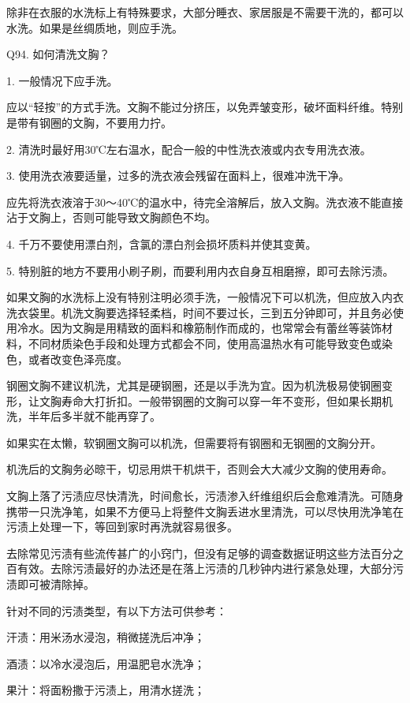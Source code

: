 \documentclass[12pt,UTF8]{ctexbook}
\begin{document}
除非在衣服的水洗标上有特殊要求，大部分睡衣、家居服是不需要干洗的，都可以水洗。如果是丝绸质地，则应手洗。





Q94. 如何清洗文胸？


1. 一般情况下应手洗。

应以“轻按”的方式手洗。文胸不能过分挤压，以免弄皱变形，破坏面料纤维。特别是带有钢圈的文胸，不要用力拧。

2. 清洗时最好用30℃左右温水，配合一般的中性洗衣液或内衣专用洗衣液。

3. 使用洗衣液要适量，过多的洗衣液会残留在面料上，很难冲洗干净。

应先将洗衣液溶于30～40℃的温水中，待完全溶解后，放入文胸。洗衣液不能直接沾于文胸上，否则可能导致文胸颜色不均。

4. 千万不要使用漂白剂，含氯的漂白剂会损坏质料并使其变黄。

5. 特别脏的地方不要用小刷子刷，而要利用内衣自身互相磨擦，即可去除污渍。


如果文胸的水洗标上没有特别注明必须手洗，一般情况下可以机洗，但应放入内衣洗衣袋里。机洗文胸要选择轻柔档，时间不要过长，三到五分钟即可，并且务必使用冷水。因为文胸是用精致的面料和橡筋制作而成的，也常常会有蕾丝等装饰材料，不同材质染色手段和处理方式都会不同，使用高温热水有可能导致变色或染色，或者改变色泽亮度。


钢圈文胸不建议机洗，尤其是硬钢圈，还是以手洗为宜。因为机洗极易使钢圈变形，让文胸寿命大打折扣。一般带钢圈的文胸可以穿一年不变形，但如果长期机洗，半年后多半就不能再穿了。

如果实在太懒，软钢圈文胸可以机洗，但需要将有钢圈和无钢圈的文胸分开。

机洗后的文胸务必晾干，切忌用烘干机烘干，否则会大大减少文胸的使用寿命。


文胸上落了污渍应尽快清洗，时间愈长，污渍渗入纤维组织后会愈难清洗。可随身携带一只洗净笔，如果不方便马上将整件文胸丢进水里清洗，可以尽快用洗净笔在污渍上处理一下，等回到家时再洗就容易很多。

去除常见污渍有些流传甚广的小窍门，但没有足够的调查数据证明这些方法百分之百有效。去除污渍最好的办法还是在落上污渍的几秒钟内进行紧急处理，大部分污渍即可被清除掉。


针对不同的污渍类型，有以下方法可供参考：

汗渍：用米汤水浸泡，稍微搓洗后冲净；

酒渍：以冷水浸泡后，用温肥皂水洗净；

果汁：将面粉撒于污渍上，用清水搓洗；
\end{document}
